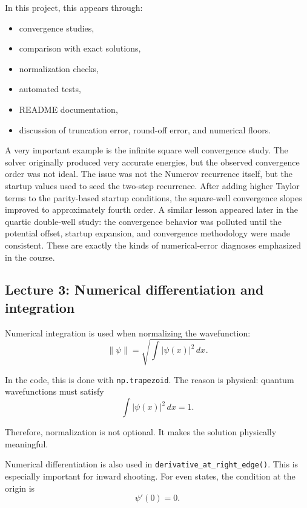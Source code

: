 \documentclass[11pt]{article}
\begin{document}
    In this project, this appears through:
    \begin{itemize}
        \item convergence studies,
        \item comparison with exact solutions,
        \item normalization checks,
        \item automated tests,
        \item README documentation,
        \item discussion of truncation error, round-off error, and numerical floors.
    \end{itemize}

    A very important example is the infinite square well convergence study. The solver originally produced very accurate energies, but the observed convergence order was not ideal. The issue was not the Numerov recurrence itself, but the startup values used to seed the two-step recurrence. After adding higher Taylor terms to the parity-based startup conditions, the square-well convergence slopes improved to approximately fourth order. A similar lesson appeared later in the quartic double-well study: the convergence behavior was polluted until the potential offset, startup expansion, and convergence methodology were made consistent. These are exactly the kinds of numerical-error diagnoses emphasized in the course.

    \subsection{Lecture 3: Numerical differentiation and integration}

    Numerical integration is used when normalizing the wavefunction:
    \begin{equation}
        \|\psi\| = \sqrt{\int |\psi(x)|^2\,dx}.
    \end{equation}

    In the code, this is done with \texttt{np.trapezoid}. The reason is physical: quantum wavefunctions must satisfy
    \begin{equation}
        \int |\psi(x)|^2\,dx = 1.
    \end{equation}

    Therefore, normalization is not optional. It makes the solution physically meaningful.

    Numerical differentiation is also used in \texttt{derivative\_at\_right\_edge()}. This is especially important for inward shooting. For even states, the condition at the origin is
    \begin{equation}
        \psi'(0)=0.
    \end{equation}
\end{document}
